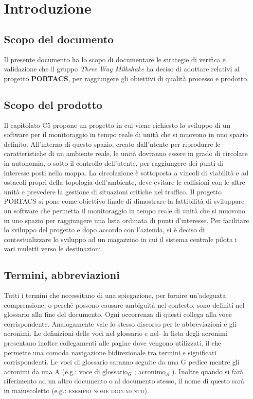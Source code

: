 \section{Introduzione}
\subsection{Scopo del documento}
Il presente documento ha lo scopo di documentare le strategie di verifica e validazione che il gruppo \textit{Three Way Milkshake} ha deciso di adottare relativi al progetto \textbf{PORTACS}, per raggiungere gli obiettivi di qualità processo e prodotto.

\subsection{Scopo del prodotto}
Il capitolato C5 propone un progetto in cui viene richiesto lo sviluppo di un software per il monitoraggio in tempo reale di unità che si muovono in uno spazio definito. All’interno di questo spazio, creato dall’utente per riprodurre le caratteristiche di un ambiente reale, le unità dovranno essere in grado di circolare in autonomia, o sotto il controllo dell’utente, per raggiungere dei punti di interesse posti nella mappa.  La circolazione è sottoposta a vincoli di viabilità e ad ostacoli propri della topologia dell’ambiente, deve evitare le collisioni con le altre unità e prevedere la gestione di situazioni critiche nel traffico.
\newline\newline
Il progetto PORTACS si pone come obiettivo finale di dimostrare la fattibilità di sviluppare un software che permetta il monitoraggio in tempo reale di unità che si muovono in uno spazio per raggiungere una lista ordinata di punti d’interesse. Per facilitare lo sviluppo del progetto e dopo accordo con l'azienda, si è deciso di contestualizzare lo sviluppo ad un magazzino in cui il sistema centrale pilota i vari muletti verso le destinazioni.

\subsection{Termini, abbreviazioni}
Tutti i termini che necessitano di una spiegazione, per fornire un’adeguata comprensione,
o perché possono causare ambiguità nel contesto, sono definiti nel glossario alla fine del documento.
\newline
Ogni occorrenza di questi collega alla voce corrispondente. Analogamente vale lo
stesso discorso per le abbreviazioni e gli acronimi. Le definizioni delle voci nel glossario e nel-
la lista degli acronimi presentano inoltre collegamenti alle pagine dove vengono utilizzati, il
che permette una comoda navigazione bidirezionale tra termini e significati corrispondenti.
\newline\newline
Le voci di glossario saranno seguite da una G pedice mentre gli acronimi da una A (e.g.: voce di glossario$_G$ ; acronimo$_A$ ). Inoltre quando si farà riferimento ad un altro documento o al documento stesso, il
nome di questo sarà in maiuscoletto (e.g.: \textsc{esempio nome documento}).
\pagebreak
